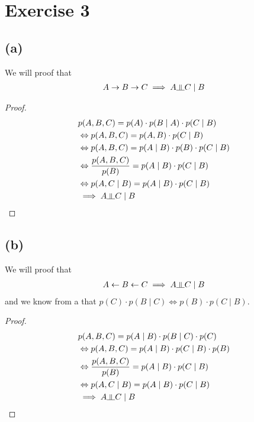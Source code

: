 \documentclass{article}
\newcommand{\dsep}{\rotatebox[origin=c]{90}{$\models$}}
\begin{document}
\section*{Exercise 3}
\subsection*{(a)}
We will proof that 
\begin{align*}
    A \rightarrow B \rightarrow C \implies A \dsep C \mid B
\end{align*}
\begin{proof}
\begin{align*}
	&p(A,B,C) = p(A) \cdot p(B \mid A) \cdot p(C\mid B) \\
	&\Leftrightarrow p(A,B,C) = p(A, B) \cdot p(C\mid B) \\
	&\Leftrightarrow p(A,B,C) = p(A\mid B) \cdot p(B) \cdot p(C\mid B) \\
	&\Leftrightarrow \frac{p(A,B,C)}{p(B)} = p(A\mid B) \cdot p(C\mid B) \\
	&\Leftrightarrow p(A,C \mid B) = p(A\mid B) \cdot p(C\mid B) \\
    &\implies A \dsep C \mid B
\end{align*}
\end{proof}

\subsection*{(b)}
We will proof that 
\begin{align*}
    A \leftarrow B \leftarrow C \implies A \dsep C \mid B
\end{align*}
and we know from a that $p(C) \cdot p(B \mid C) \Leftrightarrow p(B) \cdot p(C \mid B)$.
\begin{proof}
\begin{align*}
	&p(A,B,C) = p(A \mid B) \cdot p(B \mid C) \cdot p(C) \\
	&\Leftrightarrow p(A,B,C) = p(A\mid B) \cdot p(C\mid B) \cdot p(B) \\
	&\Leftrightarrow \frac{p(A,B,C)}{p(B)} = p(A\mid B) \cdot p(C\mid B) \\
	&\Leftrightarrow p(A,C \mid B) = p(A\mid B) \cdot p(C\mid B)\\
    &\implies A \dsep C \mid B
\end{align*}
\end{proof}
\end{document}
